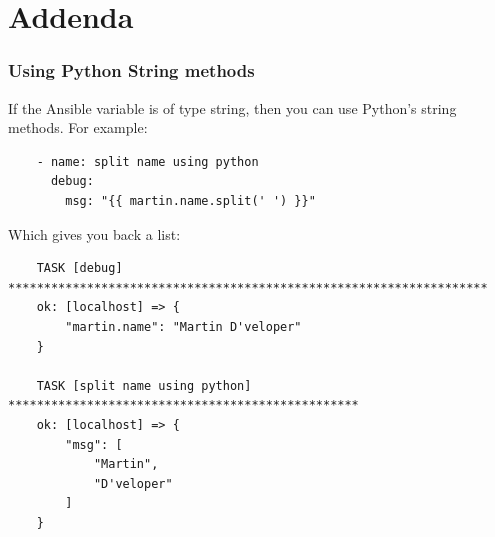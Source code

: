 \documentclass[pdf]{beamer}
\begin{document}
\section{Addenda}

\begin{frame}[fragile]
  \frametitle{Using Python String methods}
  If the Ansible variable is of type string, then you can use Python's string
  methods. For example:
  \begin{verbatim}
    - name: split name using python
      debug:
        msg: "{{ martin.name.split(' ') }}"
  \end{verbatim}
  \pause{}
  Which gives you back a list:
  \begin{verbatim}
    TASK [debug] *******************************************************************
    ok: [localhost] => {
        "martin.name": "Martin D'veloper"
    }

    TASK [split name using python] *************************************************
    ok: [localhost] => {
        "msg": [
            "Martin",
            "D'veloper"
        ]
    }
  \end{verbatim}
\end{frame}
\end{document}
